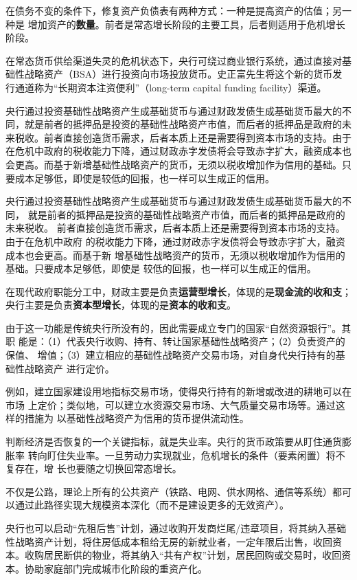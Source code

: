 在债务不变的条件下，修复资产负债表有两种方式：一种是提高资产的估值；另一种是
增加资产的\textbf{数量}。前者是常态增长阶段的主要工具，后者则适用于危机增长阶段。

在常态货币供给渠道失灵的危机状态下，央行可绕过商业银行系统，通过直接对基础性战略资产（BSA）进行投资向市场投放货币。史正富先生将这个新的货币发行通道称为“长期资本注资便利”（long-term capital funding facility）渠道。

央行通过投资基础性战略资产生成基础货币与通过财政发债生成基础货币最大的不同，就是前者的抵押品是投资的基础性战略资产市值，而后者的抵押品是政府的未来税收。前者直接创造货币需求，后者本质上还是需要得到资本市场的支持。由于在危机中政府的税收能力下降，通过财政赤字发债将会导致赤字扩大，融资成本也会更高。而基于新增基础性战略资产的货币，无须以税收增加作为信用的基础。只要成本足够低，即使是较低的回报，也一样可以生成正的信用。

央行通过投资基础性战略资产生成基础货币与通过财政发债生成基础货币最大的不同，
就是前者的抵押品是投资的基础性战略资产市值，而后者的抵押品是政府的未来税收。
前者直接创造货币需求，后者本质上还是需要得到资本市场的支持。由于在危机中政府
的税收能力下降，通过财政赤字发债将会导致赤字扩大，融资成本也会更高。而基于新
增基础性战略资产的货币，无须以税收增加作为信用的基础。只要成本足够低，即使是
较低的回报，也一样可以生成正的信用。

在现代政府职能分工中，财政主要是负责\textbf{运营型增长}，体现的是\textbf{现金流的收和支}；
央行主要是负责\textbf{资本型增长}，体现的是\textbf{资本的收和支}。

由于这一功能是传统央行所没有的，因此需要成立专门的国家“自然资源银行”。其职
能是：（1）代表央行收购、持有、转让国家基础性战略资产；（2）负责资产的保值、
增值；（3）建立相应的基础性战略资产交易市场，对自身代央行持有的基础性战略资产
进行定价。

例如，建立国家建设用地指标交易市场，使得央行持有的新增或改进的耕地可以在市场
上定价；类似地，可以建立水资源交易市场、大气质量交易市场等。通过这样的措施为
以基础性战略资产为信用的货币提供流动性。

判断经济是否恢复的一个关键指标，就是失业率。央行的货币政策要从盯住通货膨胀率
转向盯住失业率。一旦劳动力实现就业，危机增长的条件（要素闲置）将不复存在，增
长也要随之切换回常态增长。

不仅是公路，理论上所有的公共资产（铁路、电网、供水网格、通信等系统）都可以通过此路径实现大规模资本深化（而不是建设更多的无效资产）。

央行也可以启动“先租后售”计划，通过收购开发商烂尾/违章项目，将其纳入基础性战略资产计划，将住房低成本租给无房的新就业者，一定年限后出售，收回资本。收购居民断供的物业，将其纳入“共有产权”计划，居民回购或交易时，收回资本。协助家庭部门完成城市化阶段的重资产化。


